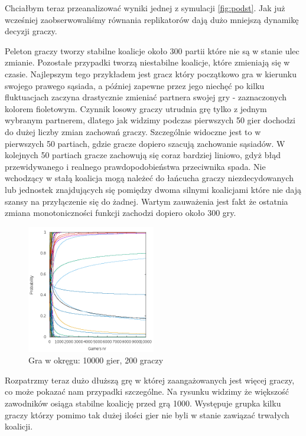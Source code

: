 Chciałbym teraz przeanalizować wyniki jednej z symulacji \ref{fig:podst}. Jak już wcześniej zaobserwowaliśmy równania replikatorów dają dużo mniejszą dynamikę decyzji graczy.

Peleton graczy tworzy stabilne koalicje około 300 partii które nie są w stanie ulec zmianie. Pozostałe przypadki tworzą niestabilne koalicje, które zmieniają się w czasie. Najlepszym tego przykładem jest gracz który początkowo gra w kierunku swojego prawego sąsiada, a później zapewne przez jego niechęć po kilku fluktuacjach zaczyna drastycznie zmieniać partnera swojej gry - zaznaczonych kolorem fioletowym. Czynnik losowy graczy utrudnia grę tylko z jednym wybranym partnerem, dlatego jak widzimy podczas pierwszych 50 gier dochodzi do dużej liczby zmian zachowań graczy. Szczególnie widoczne jest to w pierwszych 50 partiach, gdzie gracze dopiero szacują zachowanie sąsiadów. W kolejnych 50 partiach gracze zachowują się coraz bardziej liniowo, gdyż błąd przewidywanego i realnego prawdopodobieństwa przeciwnika spada. Nie wchodzący w stałą koalicja mogą należeć do łańcucha graczy niezdecydowanych lub jednostek znajdujących się pomiędzy dwoma silnymi koalicjami które nie dają szansy na przyłączenie się do żadnej. Wartym zauważenia jest fakt że ostatnia zmiana monotoniczności funkcji zachodzi dopiero około 300 gry.

\begin{figure}
    \centering
    \includegraphics[width=0.5\textwidth]{pict/wyniki/g10000p200}   
    \caption{Gra w okręgu: 10000 gier, 200 graczy}
	\label{fig:niechciani} 
\end{figure}

Rozpatrzmy teraz dużo dłuższą grę w której zaangażowanych jest więcej graczy, co może pokazać nam przypadki szczególne. Na rysunku widzimy że większość zawodników osiąga stabilne koalicję przed grą 1000. Występuje grupka kilku graczy którzy pomimo tak dużej ilości gier nie byli w stanie zawiązać trwałych koalicji.


